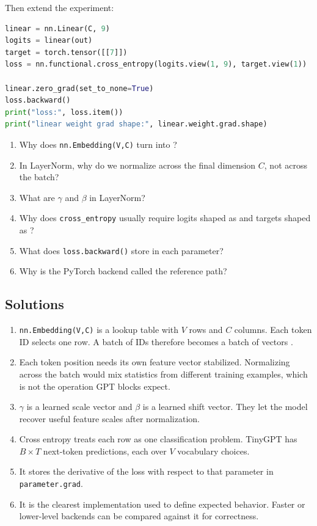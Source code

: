 Then extend the experiment:

\begin{lstlisting}[language=Python]
linear = nn.Linear(C, 9)
logits = linear(out)
target = torch.tensor([[7]])
loss = nn.functional.cross_entropy(logits.view(1, 9), target.view(1))

linear.zero_grad(set_to_none=True)
loss.backward()
print("loss:", loss.item())
print("linear weight grad shape:", linear.weight.grad.shape)
\end{lstlisting}

\checkpoint

\begin{enumerate}
  \item Why does \texttt{nn.Embedding(V,C)} turn \shape{[B,T]} into \shape{[B,T,C]}?
  \item In LayerNorm, why do we normalize across the final dimension \(C\), not across the batch?
  \item What are \(\gamma\) and \(\beta\) in LayerNorm?
  \item Why does \texttt{cross\_entropy} usually require logits shaped as \shape{[B*T,V]} and targets shaped as \shape{[B*T]}?
  \item What does \texttt{loss.backward()} store in each parameter?
  \item Why is the PyTorch backend called the reference path?
\end{enumerate}

\subsection*{Solutions}

\begin{enumerate}
  \item \texttt{nn.Embedding(V,C)} is a lookup table with \(V\) rows and \(C\) columns. Each token ID selects one row. A batch of IDs \shape{[B,T]} therefore becomes a batch of vectors \shape{[B,T,C]}.
  \item Each token position needs its own feature vector stabilized. Normalizing across the batch would mix statistics from different training examples, which is not the operation GPT blocks expect.
  \item \(\gamma\) is a learned scale vector and \(\beta\) is a learned shift vector. They let the model recover useful feature scales after normalization.
  \item Cross entropy treats each row as one classification problem. TinyGPT has \(B \times T\) next-token predictions, each over \(V\) vocabulary choices.
  \item It stores the derivative of the loss with respect to that parameter in \texttt{parameter.grad}.
  \item It is the clearest implementation used to define expected behavior. Faster or lower-level backends can be compared against it for correctness.
\end{enumerate}
